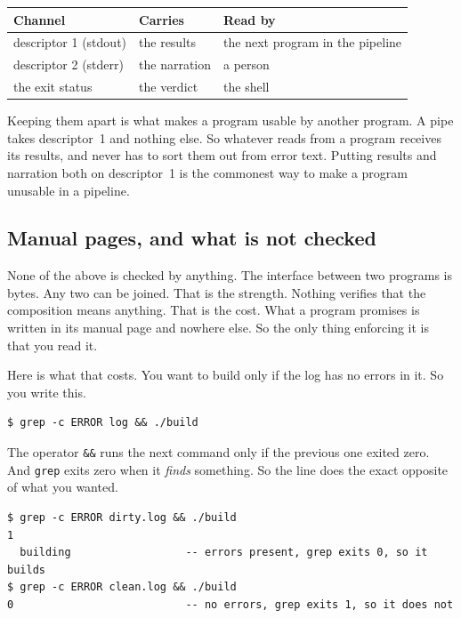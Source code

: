 \documentclass[11pt,a4paper]{article}
\begin{document}
\begin{center}
\begin{tabular}{lll}
\toprule
\textbf{Channel} & \textbf{Carries} & \textbf{Read by} \\
\midrule
descriptor 1 (stdout) & the results  & the next program in the pipeline \\
descriptor 2 (stderr) & the narration & a person \\
the exit status       & the verdict  & the shell \\
\bottomrule
\end{tabular}
\end{center}

Keeping them apart is what makes a program usable by another program. A pipe takes descriptor~1
and nothing else. So whatever reads from a program receives its results, and never has to sort them
out from error text. Putting results and narration both on descriptor~1 is the commonest way to
make a program unusable in a pipeline.

\subsection{Manual pages, and what is not checked}

None of the above is checked by anything. The interface between two programs is bytes. Any two
can be joined. That is the strength. Nothing verifies that the composition means anything. That is
the cost. What a program promises is written in its manual page and nowhere else. So the only thing
enforcing it is that you read it.

Here is what that costs. You want to build only if the log has no errors in it. So you write
this.

\begin{lstlisting}[language=SH]
$ grep -c ERROR log && ./build
\end{lstlisting}

The operator \texttt{\&\&} runs the next command only if the previous one exited zero. And \texttt{grep} exits
zero when it \emph{finds} something. So the line does the exact opposite of what you wanted.

\begin{lstlisting}[language=SH]
$ grep -c ERROR dirty.log && ./build
1
  building                  -- errors present, grep exits 0, so it builds
$ grep -c ERROR clean.log && ./build
0                           -- no errors, grep exits 1, so it does not
\end{lstlisting}
\end{document}
